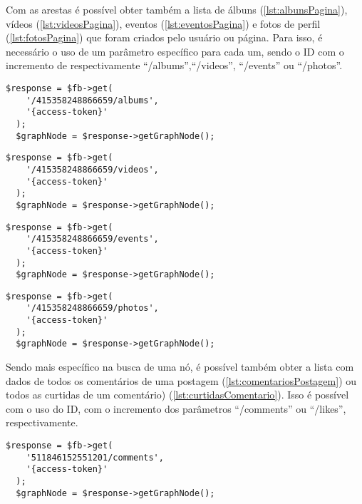 Com as arestas é possível obter também a lista de álbuns (\ref{lst:albunsPagina}), vídeos (\ref{lst:videosPagina}), eventos (\ref{lst:eventosPagina}) e fotos de perfil (\ref{lst:fotosPagina}) que foram criados pelo usuário ou página. Para isso, é necessário o uso de um parâmetro específico para cada um, sendo o ID com o incremento de respectivamente ``/albums'',``/videos'', ``/events'' ou ``/photos''.
\begin{lstlisting}[caption={Requisitar todos os álbuns de uma página},label={lst:albunsPagina}]
  $response = $fb->get( 
    '/415358248866659/albums', 
    '{access-token}'
  );
  $graphNode = $response->getGraphNode();
\end{lstlisting}

\begin{lstlisting}[caption={Requisitar os vídeos publicados na página},label={lst:videosPagina}]
  $response = $fb->get( 
    '/415358248866659/videos', 
    '{access-token}'
  );
  $graphNode = $response->getGraphNode();
\end{lstlisting}

\begin{lstlisting}[caption={Requisitar os eventos agendados pela página},label={lst:eventosPagina}]
  $response = $fb->get( 
    '/415358248866659/events', 
    '{access-token}'
  );
  $graphNode = $response->getGraphNode();
\end{lstlisting}


\begin{lstlisting}[caption={Requisitar as fotos de perfil publicadas na página},label={lst:fotosPagina}]
  $response = $fb->get( 
    '/415358248866659/photos', 
    '{access-token}'
  );
  $graphNode = $response->getGraphNode();
\end{lstlisting}

Sendo mais específico na busca de uma nó, é possível também obter a lista com dados de todos os comentários de uma postagem (\ref{lst:comentariosPostagem}) ou todos as curtidas de um comentário) (\ref{lst:curtidasComentario}). Isso é possível com o uso do ID, com o incremento dos parâmetros ``/comments'' ou ``/likes'', respectivamente.

\begin{lstlisting}[caption={Requisitar todos os comentários de uma postagem em uma página},label={lst:comentariosPostagem}]
  $response = $fb->get( 
    '511846152551201/comments', 
    '{access-token}'
  );
  $graphNode = $response->getGraphNode();
\end{lstlisting}

